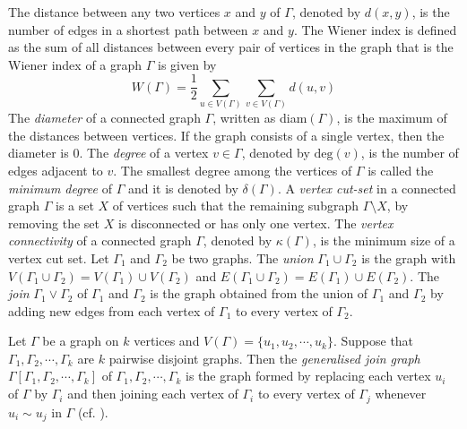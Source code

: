\documentclass{amsart}
\theoremstyle{plain}
\theoremstyle{definition}
\theoremstyle{remark}
\begin{document}
 The distance between any two vertices $x$ and $y$ of $\Gamma$, denoted by $d(x,y)$, is the number of edges in a shortest path between $x$ and $y$. The Wiener index is defined as the sum of all distances between every pair of vertices in the graph that is the Wiener index of a graph $\Gamma$ is given by
\[ W(\Gamma) = \dfrac{1}{2}\sum_{u \in V(\Gamma)}\sum_{v \in V(\Gamma)} d(u,v) \]
The \emph{diameter} of a connected graph $\Gamma$, written as \rm{diam}$(\Gamma)$, is the maximum of the distances between vertices. If the graph consists of a single vertex, then the diameter is $0$. The \emph{degree} of a vertex $v \in \Gamma$, denoted by $\text{deg}(v)$, is the number of edges adjacent to $v$. The smallest degree among the vertices of $\Gamma$ is called the \emph{minimum degree} of $\Gamma$ and it is denoted by $\delta(\Gamma)$. A \emph{vertex cut-set} in a connected graph $\Gamma$ is a set $X$ of vertices such that the remaining subgraph $\Gamma \setminus X$, by removing the set $X$ is disconnected or has only one vertex. The \emph{vertex connectivity} of a connected graph $\Gamma$, denoted by $\kappa(\Gamma)$, is the minimum size of a vertex cut set. Let  $\Gamma_1$ and  $\Gamma_2$ be two graphs. The \emph{union} $\Gamma_1 \cup \Gamma_2$ is the graph with $V(\Gamma_1 \cup \Gamma_2) = V(\Gamma_1) \cup V(\Gamma_2)$ and $E(\Gamma_1 \cup \Gamma_2) = E(\Gamma_1) \cup E(\Gamma_2)$. The \emph{join} $\Gamma_1 \vee \Gamma_2$ of $\Gamma_1$ and $\Gamma_2$ is the graph obtained from the union of $\Gamma_1$ and $\Gamma_2$ by adding new edges from each vertex of $\Gamma_1$ to every vertex of $\Gamma_2$.
 
 
 
  Let $\Gamma$ be a graph on $k$ vertices and $V(\Gamma) = \{u_1, u_2, \cdots, u_k\}$. Suppose that $\Gamma_1, \Gamma_2, \cdots, \Gamma_k$ are $k$ pairwise disjoint graphs. Then the \emph{generalised join graph} $\Gamma[\Gamma_1, \Gamma_2, \cdots, \Gamma_k]$ of $\Gamma_1, \Gamma_2, \cdots, \Gamma_k$ is the graph formed by replacing each vertex $u_i$ of $\Gamma$ by $\Gamma_i$ and then joining each vertex of $\Gamma_i$ to every vertex of $\Gamma_j$ whenever $u_i \sim u_j$ in $\Gamma$ (cf. \cite{schwenk1974computing}).
 
\end{document}
